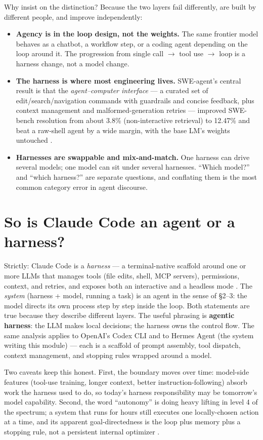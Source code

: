 \documentclass[11pt]{article}
\begin{document}
Why insist on the distinction? Because the two layers fail differently, are built by different people, and improve independently:

\begin{itemize}[noitemsep]
  \item \textbf{Agency is in the loop design, not the weights.} The same frontier model behaves as a chatbot, a workflow step, or a coding agent depending on the loop around it. The progression from single call $\to$ tool use $\to$ loop is a harness change, not a model change.
  \item \textbf{The harness is where most engineering lives.} SWE-agent's central result is that the \emph{agent--computer interface} --- a curated set of edit/search/navigation commands with guardrails and concise feedback, plus context management and malformed-generation retries --- improved SWE-bench resolution from about 3.8\% (non-interactive retrieval) to 12.47\% and beat a raw-shell agent by a wide margin, with the base LM's weights untouched \cite{yang2024sweagent}.
  \item \textbf{Harnesses are swappable and mix-and-match.} One harness can drive several models; one model can sit under several harnesses. ``Which model?'' and ``which harness?'' are separate questions, and conflating them is the most common category error in agent discourse.
\end{itemize}

\section{So is Claude Code an agent or a harness?}
Strictly: Claude Code is a \emph{harness} --- a terminal-native scaffold around one or more LLMs that manages tools (file edits, shell, MCP servers), permissions, context, and retries, and exposes both an interactive and a headless mode \cite{anthropic2025claudecode}. The \emph{system} (harness + model, running a task) is an agent in the sense of \S2--3: the model directs its own process step by step inside the loop. Both statements are true because they describe different layers. The useful phrasing is \textbf{agentic harness}: the LLM makes local decisions; the harness owns the control flow. The same analysis applies to OpenAI's Codex CLI and to Hermes Agent (the system writing this module) --- each is a scaffold of prompt assembly, tool dispatch, context management, and stopping rules wrapped around a model.

Two caveats keep this honest. First, the boundary moves over time: model-side features (tool-use training, longer context, better instruction-following) absorb work the harness used to do, so today's harness responsibility may be tomorrow's model capability. Second, the word ``autonomy'' is doing heavy lifting in level 4 of the spectrum; a system that runs for hours still executes one locally-chosen action at a time, and its apparent goal-directedness is the loop plus memory plus a stopping rule, not a persistent internal optimizer \cite{wang2024survey}.
\end{document}
